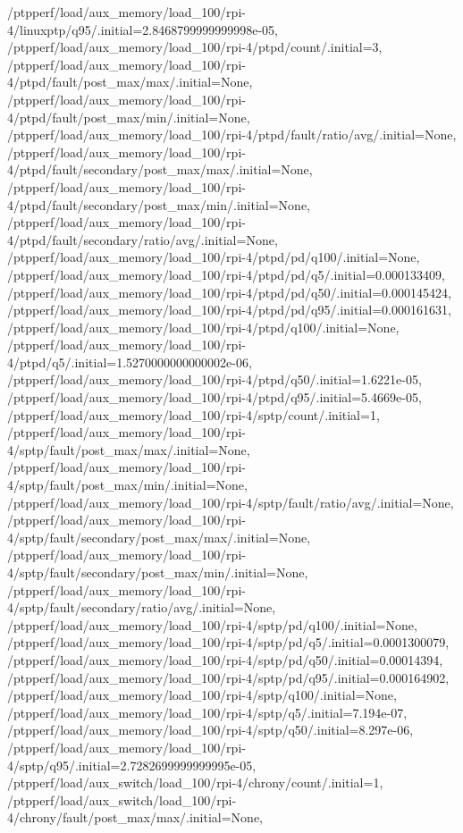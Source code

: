 {    /ptpperf/load/aux_memory/load_100/rpi-4/linuxptp/q95/.initial=2.8468799999999998e-05,
    /ptpperf/load/aux_memory/load_100/rpi-4/ptpd/count/.initial=3,
    /ptpperf/load/aux_memory/load_100/rpi-4/ptpd/fault/post_max/max/.initial=None,
    /ptpperf/load/aux_memory/load_100/rpi-4/ptpd/fault/post_max/min/.initial=None,
    /ptpperf/load/aux_memory/load_100/rpi-4/ptpd/fault/ratio/avg/.initial=None,
    /ptpperf/load/aux_memory/load_100/rpi-4/ptpd/fault/secondary/post_max/max/.initial=None,
    /ptpperf/load/aux_memory/load_100/rpi-4/ptpd/fault/secondary/post_max/min/.initial=None,
    /ptpperf/load/aux_memory/load_100/rpi-4/ptpd/fault/secondary/ratio/avg/.initial=None,
    /ptpperf/load/aux_memory/load_100/rpi-4/ptpd/pd/q100/.initial=None,
    /ptpperf/load/aux_memory/load_100/rpi-4/ptpd/pd/q5/.initial=0.000133409,
    /ptpperf/load/aux_memory/load_100/rpi-4/ptpd/pd/q50/.initial=0.000145424,
    /ptpperf/load/aux_memory/load_100/rpi-4/ptpd/pd/q95/.initial=0.000161631,
    /ptpperf/load/aux_memory/load_100/rpi-4/ptpd/q100/.initial=None,
    /ptpperf/load/aux_memory/load_100/rpi-4/ptpd/q5/.initial=1.5270000000000002e-06,
    /ptpperf/load/aux_memory/load_100/rpi-4/ptpd/q50/.initial=1.6221e-05,
    /ptpperf/load/aux_memory/load_100/rpi-4/ptpd/q95/.initial=5.4669e-05,
    /ptpperf/load/aux_memory/load_100/rpi-4/sptp/count/.initial=1,
    /ptpperf/load/aux_memory/load_100/rpi-4/sptp/fault/post_max/max/.initial=None,
    /ptpperf/load/aux_memory/load_100/rpi-4/sptp/fault/post_max/min/.initial=None,
    /ptpperf/load/aux_memory/load_100/rpi-4/sptp/fault/ratio/avg/.initial=None,
    /ptpperf/load/aux_memory/load_100/rpi-4/sptp/fault/secondary/post_max/max/.initial=None,
    /ptpperf/load/aux_memory/load_100/rpi-4/sptp/fault/secondary/post_max/min/.initial=None,
    /ptpperf/load/aux_memory/load_100/rpi-4/sptp/fault/secondary/ratio/avg/.initial=None,
    /ptpperf/load/aux_memory/load_100/rpi-4/sptp/pd/q100/.initial=None,
    /ptpperf/load/aux_memory/load_100/rpi-4/sptp/pd/q5/.initial=0.0001300079,
    /ptpperf/load/aux_memory/load_100/rpi-4/sptp/pd/q50/.initial=0.00014394,
    /ptpperf/load/aux_memory/load_100/rpi-4/sptp/pd/q95/.initial=0.000164902,
    /ptpperf/load/aux_memory/load_100/rpi-4/sptp/q100/.initial=None,
    /ptpperf/load/aux_memory/load_100/rpi-4/sptp/q5/.initial=7.194e-07,
    /ptpperf/load/aux_memory/load_100/rpi-4/sptp/q50/.initial=8.297e-06,
    /ptpperf/load/aux_memory/load_100/rpi-4/sptp/q95/.initial=2.7282699999999995e-05,
    /ptpperf/load/aux_switch/load_100/rpi-4/chrony/count/.initial=1,
    /ptpperf/load/aux_switch/load_100/rpi-4/chrony/fault/post_max/max/.initial=None,
}
